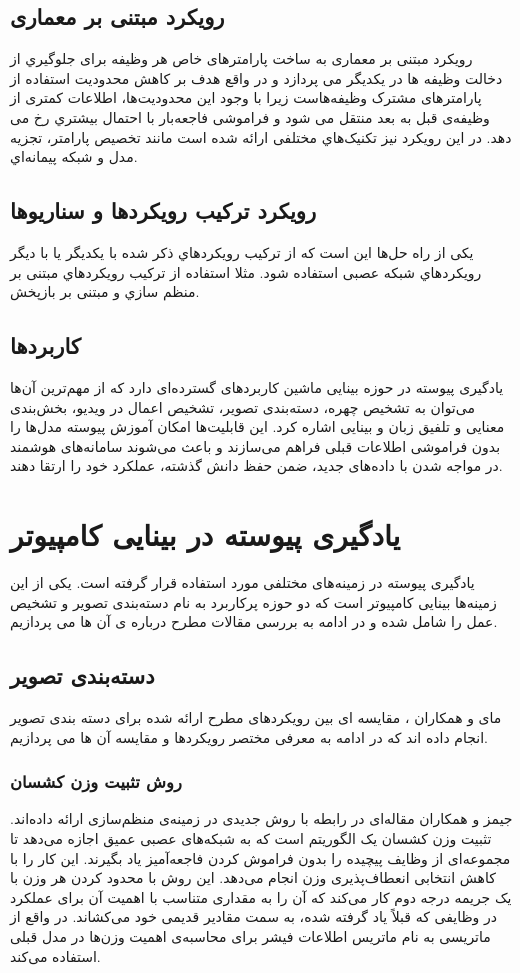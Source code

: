 \subsection{رویکرد مبتنی بر معماری}
رویکرد مبتنی بر معماری 
به ساخت پارامتر‌های خاص هر وظیفه برای جلوگیري از دخالت وظیفه ها در یکدیگر می پردازد و در واقع هدف بر کاهش محدودیت استفاده از پارامتر‌های مشترک وظیفه‌هاست زیرا با وجود این محدودیت‌ها، اطلاعات کمتری از وظیفه‌ی قبل به بعد منتقل می شود و فراموشی فاجعه‌بار با احتمال بیشتري رخ می دهد. در این رویکرد نیز تکنیک‌هاي مختلفی ارائه شده است مانند تخصیص پارامتر، تجزیه مدل و شبکه پیمانه‌اي.
\subsection{رویکرد ترکیب رویکردها و سناریوها}
یکی از راه حل‌ها این است که از ترکیب رویکردهاي ذکر شده با یکدیگر یا با دیگر رویکردهاي شبکه عصبی استفاده شود. مثلا استفاده از ترکیب رویکردهاي مبتنی بر منظم سازي و مبتنی بر بازپخش.

\subsection{کاربردها}
یادگیری پیوسته در حوزه بینایی ماشین کاربردهای گسترده‌ای دارد که از مهم‌ترین آن‌ها می‌توان به تشخیص چهره، دسته‌بندی تصویر، تشخیص اعمال در ویدیو، بخش‌بندی معنایی و تلفیق زبان و بینایی اشاره کرد. این قابلیت‌ها امکان آموزش پیوسته مدل‌ها را بدون فراموشی اطلاعات قبلی فراهم می‌سازند و باعث می‌شوند سامانه‌های هوشمند در مواجه شدن با داده‌های جدید، ضمن حفظ دانش گذشته، عملکرد خود را ارتقا دهند.

\section{یادگیری پیوسته در بینایی کامپیوتر}
یادگیری پیوسته در زمینه‌های مختلفی مورد استفاده قرار گرفته است. یکی از این زمینه‌ها بینایی کامپیوتر است که دو حوزه پرکاربرد به نام دسته‌بندی تصویر و تشخیص عمل را شامل شده و در ادامه به بررسی مقالات مطرح درباره ی آن ها می پردازیم. 
\subsection{دسته‌بندی تصویر}
مای و همکاران 
\cite{2}
، مقایسه ای بین رویکردهای مطرح ارائه شده برای دسته بندی تصویر انجام داده اند که در ادامه به معرفی مختصر رویکردها و مقایسه آن ها می پردازیم.
\subsubsection{روش تثبیت وزن کشسان}
جیمز و همکاران
\cite{7}
مقاله‌ای در رابطه با روش جدیدی در زمینه‌ی منظم‌سازی ارائه داده‌اند. تثبیت وزن کشسان
یک الگوریتم است که به شبکه‌های عصبی عمیق اجازه می‌دهد تا مجموعه‌ای از وظایف پیچیده را بدون فراموش کردن فاجعه‌آمیز یاد بگیرند. این کار را با کاهش انتخابی انعطاف‌پذیری وزن انجام می‌دهد. این روش با محدود کردن هر وزن با یک جریمه درجه دوم کار می‌کند که آن را به مقداری متناسب با اهمیت آن برای عملکرد در وظایفی که قبلاً یاد گرفته شده، به سمت مقادیر قدیمی خود می‌کشاند. در واقع از ماتریسی به نام ماتریس اطلاعات فیشر برای محاسبه‌ی اهمیت وزن‌ها در مدل قبلی استفاده می‌کند.



